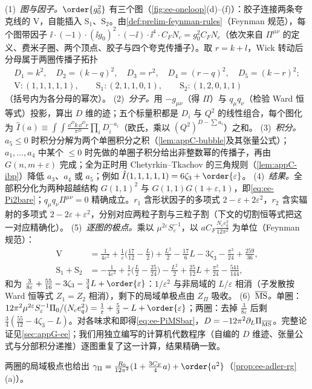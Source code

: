 \begin{proofsketch}
(1)~\emph{图与因子。}$\order{g_0^2}$ 有三个图（\cref{fig:ee-oneloop}(d)--(f)）：胶子连接两条夸克线的 V，自能插入 S$_1$、S$_2$。由\cref{def:prelim-feynman-rules}（Feynman 规范），每个图带因子 $\ii\cdot(-1)\cdot(\ii g_0)^2\cdot(-\ii)\cdot\ii^4\cdot C_FN_c=g_0^2C_FN_c$（依次来自 $\Pi^{\mu\nu}$ 的定义、费米子圈、两个顶点、胶子与四个夸克传播子）。取 $r=k+l$，Wick 转动后分母属于两圈传播子拓扑
\begin{equation}\label{eq:ee-topo}
\begin{gathered}
D_1=k^2,\quad D_2=(k-q)^2,\quad D_3=r^2,\quad D_4=(r-q)^2,\quad D_5=(k-r)^2;\\
\mathrm V:(1,1,1,1,1),\qquad \mathrm S_1:(2,1,1,0,1),\qquad \mathrm S_2:(1,2,0,1,1)
\end{gathered}
\end{equation}
（括号内为各分母的幂次）。
(2)~\emph{分子。}用 $-g_{\mu\nu}$（得 $\Pi$）与 $q_\mu q_\nu$（检验 Ward 恒等式）投影，算出 $D$ 维的迹；五个标量积都是 $D_i$ 与 $Q^2$ 的线性组合，每个图化为 $\hat I(a)\equiv\int\!\!\int\frac{\dd^Dk\,\dd^Dr}{\pi^D}\prod_iD_i^{-a_i}$（欧氏，乘以 $(Q^2)^{D-\sum a_i}$）之和。
(3)~\emph{积分。}$a_5\le0$ 时积分分解为两个单圈积分之积（\cref{lem:appC-bubble}及其张量公式）；$a_1,\dots,a_4$ 中某个 $\le0$ 时先做的单圈子积分给出非整数幂的传播子，再由 $G(n,m+\varepsilon)$ 完成；全为正时用 Chetyrkin--Tkachov 的三角规则\cite{ChetyrkinTkachov1981,Tkachov1981}（\cref{lem:appC-ibp}）降低 $a_3$、$a_4$ 或 $a_5$；例如 $\hat I(1,1,1,1,1)=6\zeta_3+\order{\varepsilon}$。
(4)~\emph{结果。}全部积分化为两种超越结构 $G(1,1)^2$ 与 $G(1,1)G(1+\varepsilon,1)$，即\cref{eq:ee-Pi2bare}；$q_\mu q_\nu\Pi^{\mu\nu}=0$ 精确成立。$r_1$ 含形状因子的多项式 $2-\varepsilon+2\varepsilon^2$，$r_2$ 含实辐射的多项式 $2-2\varepsilon+\varepsilon^2$，分别对应两粒子割与三粒子割（下文的切割恒等式把这一对应精确化）。
(5)~\emph{逐图的极点。}乘以 $\mu^{2\varepsilon}S_\varepsilon^{-1}$，以 $aC_F\frac{N_ce_q^2}{12\pi^2}$ 为单位（Feynman 规范）：
\[
\begin{aligned}
\mathrm V&=\tfrac{1}{4\varepsilon^2}+\tfrac{1}{\varepsilon}\big(\tfrac{17}{12}-\tfrac L2\big)+\tfrac{L^2}2-\tfrac{17}6L-3\zeta_3-\tfrac{\pi^2}{24}+\tfrac{259}{36},\\
\mathrm S_1+\mathrm S_2&=-\tfrac{1}{4\varepsilon^2}+\tfrac1\varepsilon\big(\tfrac L2-\tfrac{25}{24}\big)-\tfrac{L^2}2+\tfrac{25}{12}L+\tfrac{\pi^2}{24}-\tfrac{541}{144},
\end{aligned}
\]
和为 $\frac{3}{8\varepsilon}+\frac{55}{16}-3\zeta_3-\frac34L+\order{\varepsilon}$：$1/\varepsilon^2$ 与非局域的 $L/\varepsilon$ 相消（子发散按 Ward 恒等式 $Z_1=Z_2$ 相消），剩下的局域单极点由 $Z_\Pi$ 吸收。
(6)~\emph{$\overline{\rm MS}$。}单圈：$12\pi^2\mu^{2\varepsilon}S_\varepsilon^{-1}\Pi_0/(N_ce_q^2)=\frac1\varepsilon+\frac53-L+\order{\varepsilon}$；两圈：去掉 $\frac3{8\varepsilon}$ 后剩 $\frac34(\frac{55}{12}-4\zeta_3-L)$。对各味求和即得\cref{eq:ee-PiMSbar}，$D=-12\pi^2\partial_L\Pi_{\overline{\rm MS}}$。完整论证见\cref{sec:appG-ee}；我们用独立编写的计算机代数程序（自编的 $D$ 维迹、张量公式与分部积分递推）逐图重复了这一计算，结果精确一致。
\end{proofsketch}
两圈的局域极点也给出 $\gamma_\Pi=\frac{R_0}{12\pi^2}(1+\frac{3C_F}4a)+\order{a^2}$（\cref{prop:ee-adler-rg}(a)）。

